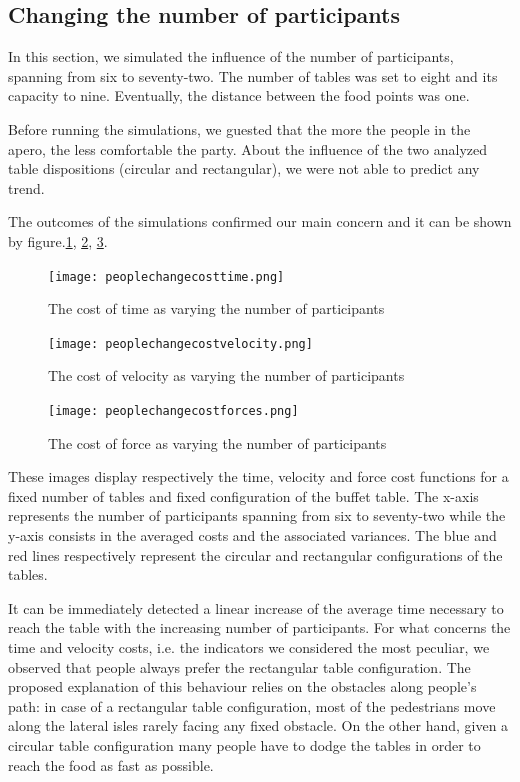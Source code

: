 \documentclass[11pt]{article}
\begin{document}
\subsection{Changing the number of participants}
In this section, we simulated the influence of the number of participants, spanning from six to seventy-two. The number of tables was set to eight and its capacity to nine. Eventually, the distance between the food points was one.

Before running the simulations, we guested that the more the people in the apero, the less comfortable the party. About the influence of the two analyzed table dispositions (circular and rectangular), we were not able to predict any trend.

The outcomes of the simulations confirmed our main concern and it can be shown by figure.\ref{fig:peoplecostt}, \ref{fig:peoplecostv}, \ref{fig:peoplecostf}.

\begin{figure}[ht!]
\centering
\texttt{[image: peoplechangecosttime.png]}
\caption{The cost of time as varying the number of participants}
\label{fig:peoplecostt}
\end{figure}

\begin{figure}[ht!]
\centering
\texttt{[image: peoplechangecostvelocity.png]}
\caption{The cost of velocity as varying the number of participants}
\label{fig:peoplecostv}
\end{figure}

\begin{figure}[ht!]
\centering
\texttt{[image: peoplechangecostforces.png]}
\caption{The cost of force as varying the number of participants}
\label{fig:peoplecostf}
\end{figure}

These images display respectively the time, velocity and force cost functions for a fixed number of tables and fixed configuration of the buffet table. The x-axis represents the number of participants spanning from six to seventy-two while the y-axis consists in the averaged costs and the associated variances. The blue and red lines respectively represent the circular and rectangular configurations of the tables.

It can be immediately detected a linear increase of the average time necessary to reach the table with the increasing number of participants. For what concerns the time and velocity costs, i.e. the indicators we considered the most peculiar, we observed that people always prefer the rectangular table configuration. The proposed explanation of this behaviour relies on the obstacles along people's path: in case of a rectangular table configuration, most of the pedestrians move along the lateral isles rarely facing any fixed obstacle. On the other hand, given a circular table configuration many people have to dodge the tables in order to reach the food as fast as possible.
\end{document}
